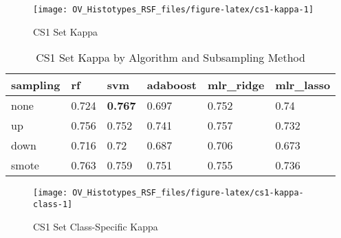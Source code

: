 \documentclass[
]{report}
\begin{document}
\begin{figure}[H]

{\centering \texttt{[image: OV\_Histotypes\_RSF\_files/figure-latex/cs1-kappa-1]} 

}

\caption{CS1 Set Kappa}\label{fig:cs1-kappa}
\end{figure}

\begin{table}

\caption{\label{tab:cs1-kappa-table}CS1 Set Kappa by Algorithm and Subsampling Method}
\centering
\begin{tabular}[t]{l|l|l|l|l|l}
\hline
sampling & rf & svm & adaboost & mlr\_ridge & mlr\_lasso\\
\hline
none & 0.724 & \textbf{0.767} & 0.697 & 0.752 & 0.74\\
\hline
up & 0.756 & 0.752 & 0.741 & 0.757 & 0.732\\
\hline
down & 0.716 & 0.72 & 0.687 & 0.706 & 0.673\\
\hline
smote & 0.763 & 0.759 & 0.751 & 0.755 & 0.736\\
\hline
\end{tabular}
\end{table}

\begin{figure}[H]

{\centering \texttt{[image: OV\_Histotypes\_RSF\_files/figure-latex/cs1-kappa-class-1]} 

}

\caption{CS1 Set Class-Specific Kappa}\label{fig:cs1-kappa-class}
\end{figure}
\end{document}
